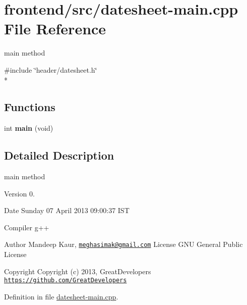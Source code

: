 \hypertarget{datesheet-main_8cpp}{\section{frontend/src/datesheet-\/main.cpp File Reference}
\label{datesheet-main_8cpp}
}


main method  


{\ttfamily \#include \char`\"{}header/datesheet.\-h\char`\"{}}\\*
\subsection*{Functions}
\begin{DoxyCompactItemize}
\item 
\hypertarget{datesheet-main_8cpp_a840291bc02cba5474a4cb46a9b9566fe}{int {\bfseries main} (void)}\label{datesheet-main_8cpp_a840291bc02cba5474a4cb46a9b9566fe}

\end{DoxyCompactItemize}


\subsection{Detailed Description}
main method \begin{DoxyVersion}{Version}
0. 
\end{DoxyVersion}
\begin{DoxyDate}{Date}
Sunday 07 April 2013 09\-:00\-:37 I\-S\-T\par
Compiler g++
\end{DoxyDate}
\begin{DoxyAuthor}{Author}
Mandeep Kaur, \href{mailto:meghasimak@gmail.com}{\tt meghasimak@gmail.\-com} License G\-N\-U General Public License 
\end{DoxyAuthor}
\begin{DoxyCopyright}{Copyright}
Copyright (c) 2013, Great\-Developers \href{https://github.com/GreatDevelopers}{\tt https\-://github.\-com/\-Great\-Developers} 
\end{DoxyCopyright}


Definition in file \hyperlink{datesheet-main_8cpp_source}{datesheet-\/main.\-cpp}.

